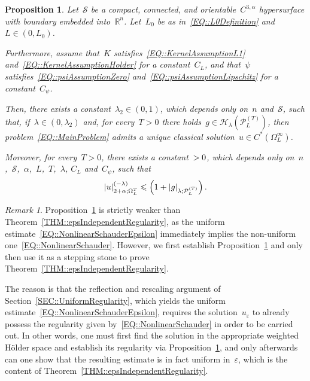 \documentclass[12pt,a4paper]{amsart}
\makeatletter
\numberwithin{equation}{section}
\newtheorem{proposition}[theorem]{Proposition}
\theoremstyle{definition}
\theoremstyle{remark}
\newtheorem{remark}[theorem]{Remark}
\newcommand{\R}{\mathbb{R}}
\newcommand{\eps}{\varepsilon}
\newcommand{\abs}[1]{\left\lvert#1\right\rvert}
\renewcommand{\leq}{\leqslant}
\newcommand{\const}[1]{%
  \csname const@#1\endcsname%
}
\makeatother
\begin{document}
\begin{proposition}\label{PROP::ExistenceRegularity}
    Let~$\mathcal{S}$ be a compact, connected, and orientable~$C^{3,\alpha}$ hypersurface with boundary embedded into~$\R^n$.  Let~$L_0$ be as in~\eqref{EQ::L0Definition} and~$L \in (0,L_0)$.
    
    Furthermore, assume that~$K$ satisfies~\eqref{EQ::KernelAssumptionL1} and~\eqref{EQ::KernelAssumptionHolder} for a constant~$C_L$, and that~$\psi$ satisfies~\eqref{EQ::psiAssumptionZero} and~\eqref{EQ::psiAssumptionLipschitz} for a constant~$C_\psi$.
    
    Then, there exists a constant~$\lambda_2 \in (0,1)$, which depends only on~$n$ and~$\mathcal{S}$, such that, if~$\lambda \in (0,\lambda_2)$ and, for every~$T>0$ there holds~$g \in \mathcal{H}_\lambda\left(\mathcal{P}_L^{(T)}\right)$, then problem~\eqref{EQ::MainProblem} admits a unique classical solution~$u \in C^\ast(\Omega_L^\infty)$.
    
    Moreover, for every~$T>0$, there exists a constant~$\const{CONST::ExistenceRegularity} > 0$, which depends only on~$n$,~$\mathcal{S}$,~$\alpha$,~$L$,~$T$,~$\lambda$, $C_L$ and~$C_\psi$, such that
    \begin{equation}\label{EQ::NonlinearSchauder}
        \abs{u}_{2+\alpha; \Omega_L^T}^{(-\lambda)} \leq \const{CONST::ExistenceRegularity}\left(1+\abs{g}_{\lambda; \mathcal{P}_L^{(T)}}\right).
    \end{equation}
\end{proposition}
 
\begin{remark}
    Proposition~\ref{PROP::ExistenceRegularity} is strictly weaker than Theorem~\ref{THM::epsIndependentRegularity}, as the uniform estimate~\eqref{EQ::NonlinearSchauderEpsilon} immediately implies the non-uniform one~\eqref{EQ::NonlinearSchauder}. However, we first establish Proposition~\ref{PROP::ExistenceRegularity} and only then use it as a stepping stone to prove Theorem~\ref{THM::epsIndependentRegularity}.
    
    The reason is that the reflection and rescaling argument of Section~\ref{SEC::UniformRegularity}, which yields the uniform estimate~\eqref{EQ::NonlinearSchauderEpsilon}, requires the solution~$u_\eps$ to already possess the regularity given by~\eqref{EQ::NonlinearSchauder} in order to be carried out. In other words, one must first find the solution in the appropriate weighted Hölder space and establish its regularity via Proposition~\ref{PROP::ExistenceRegularity}, and only afterwards can one show that the resulting estimate is in fact uniform in~$\eps$, which is the content of Theorem~\ref{THM::epsIndependentRegularity}.
\end{remark}
\end{document}
